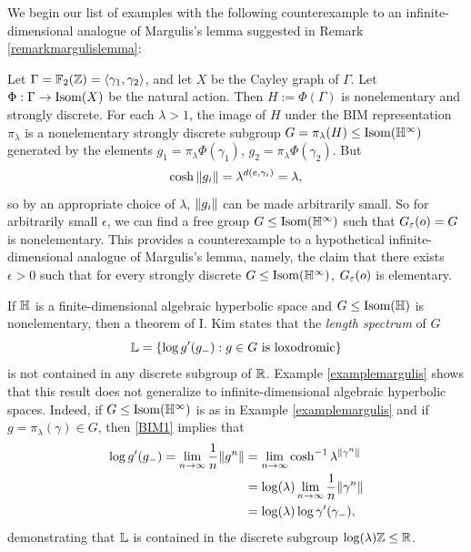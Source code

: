 We begin our list of examples with the following counterexample to an infinite-dimensional analogue of Margulis's lemma suggested in Remark \ref{remarkmargulislemma}:

\begin{example}
\label{examplemargulis}
Let $\Gamma = \F_2(\Z) = \lb \gamma_1,\gamma_2\rb$, and let $X$ be the Cayley graph of $\Gamma$. Let $\Phi:\Gamma\to \operatorname{Isom}(X)$ be the natural action. Then $H := \Phi(\Gamma)$ is nonelementary and strongly discrete. For each $\lambda > 1$, the image of $H$ under the BIM representation $\pi_\lambda$ is a nonelementary strongly discrete subgroup $G = \pi_\lambda(H)\leq \Isom(\H^\infty)$ generated by the elements $g_1 = \pi_\lambda\Phi(\gamma_1)$, $g_2 = \pi_\lambda\Phi(\gamma_2)$. But
\[
\cosh\|g_i\| = \lambda^{d(e,\gamma_i)} = \lambda,
\]
so by an appropriate choice of $\lambda$, $\|g_i\|$ can be made arbitrarily small. So for arbitrarily small $\epsilon$, we can find a free group $G\leq\Isom(\H^\infty)$ such that $G_\varepsilon(o) = G$ is nonelementary. This provides a counterexample to a hypothetical infinite-dimensional analogue of Margulis's lemma, namely, the claim that there exists $\epsilon > 0$ such that for every strongly discrete $G\leq\Isom(\H^\infty)$, $G_\varepsilon(o)$ is elementary.
\end{example}

\begin{remark}
\label{remarklengthspectrum}
If $\H$ is a finite-dimensional algebraic hyperbolic space and $G\leq\Isom(\H)$ is nonelementary, then a theorem of I. Kim \cite{Kim} states that the \emph{length spectrum} of $G$
\[
\L = \{\log g'(g_-) : g\in G \text{ is loxodromic}\}
\]
is not contained in any discrete subgroup of $\R$. Example \ref{examplemargulis} shows that this result does not generalize to infinite-dimensional algebraic hyperbolic spaces. Indeed, if $G\leq\Isom(\H^\infty)$ is as in Example \ref{examplemargulis} and if $g = \pi_\lambda(\gamma)\in G$, then \eqref{BIM1} implies that
\begin{align*}
\log g'(g_-) = \lim_{n\to\infty} \frac1n \|g^n\| &= \lim_{n\to\infty}\cosh^{-1}\lambda^{\|\gamma^n\|}\\
&= \log(\lambda)\lim_{n\to\infty}\frac1n \|\gamma^n\|\\ 
&= \log(\lambda)\log \gamma'(\gamma_-),
\end{align*}
demonstrating that $\L$ is contained in the discrete subgroup $\log(\lambda)\Z \leq\R$.
\end{remark}



